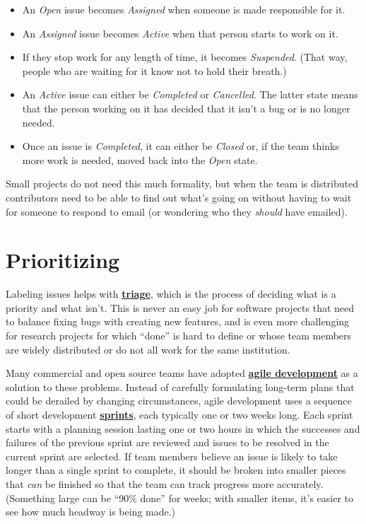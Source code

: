 \documentclass[
]{krantz}
\newcommand{\gref}[2]{\hyperlink{#2}{\textbf{#1}}}
\begin{document}
\begin{itemize}
\item
  An \emph{Open} issue becomes \emph{Assigned} when someone is made responsible for it.
\item
  An \emph{Assigned} issue becomes \emph{Active} when that person starts to work on it.
\item
  If they stop work for any length of time, it becomes \emph{Suspended}.
  (That way, people who are waiting for it know not to hold their breath.)
\item
  An \emph{Active} issue can either be \emph{Completed} or \emph{Cancelled}.
  The latter state means that the person working on it has decided that
  it isn't a bug or is no longer needed.
\item
  Once an issue is \emph{Completed},
  it can either be \emph{Closed} or,
  if the team thinks more work is needed,
  moved back into the \emph{Open} state.
\end{itemize}

Small projects do not need this much formality,
but when the team is distributed
contributors need to be able to find out what's going on
without having to wait for someone to respond to email
(or wondering who they \emph{should} have emailed).

\hypertarget{teams-prioritize}{%
\section{Prioritizing}\label{teams-prioritize}}

Labeling issues helps with \gref{triage}{triage},
which is the process of deciding what is a priority and what isn't.
This is never an easy job for software projects
that need to balance fixing bugs with creating new features,
and is even more challenging for research projects
for which ``done'' is hard to define
or whose team members are widely distributed
or do not all work for the same institution.

Many commercial and open source teams have adopted
\gref{agile development}{agile} as a solution to these problems.
Instead of carefully formulating long-term plans that could be derailed by changing circumstances,
agile development uses a sequence of short development
\gref{sprints}{sprint},
each typically one or two weeks long.
Each sprint starts with a planning session lasting one or two hours
in which the successes and failures of the previous sprint are reviewed
and issues to be resolved in the current sprint are selected.
If team members believe an issue is likely to take longer than a single sprint to complete,
it should be broken into smaller pieces that \emph{can} be finished
so that the team can track progress more accurately.
(Something large can be ``90\% done'' for weeks;
with smaller items,
it's easier to see how much headway is being made.)
\end{document}
